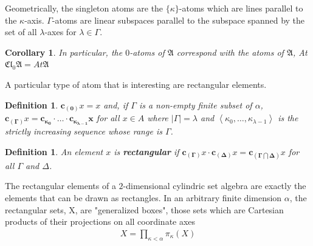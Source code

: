 \documentclass[12pt,a4paper]{article}
\newtheorem{corollary}[theorem]{Corollary}
\newtheorem{definition}[theorem]{Definition}
\begin{document}
Geometrically, the singleton atoms are the $\{\kappa\}$-atoms which are lines parallel to the $\kappa$-axis.
$\Gamma$-atoms are linear subspaces parallel to the subspace spanned by the set of all $\lambda$-axes for $\lambda\in\Gamma$.

\begin{corollary}
In particular, the $0$-atoms of $\mathfrak{A}$ correspond with the atoms of $\mathfrak{A}$, At$\mathfrak{Cl}_0\mathfrak{A}=\mathit{At}\mathfrak{A}$
\end{corollary}

A particular type of atom that is interesting are rectangular elements.

\begin{definition}
$\mathbf{c_{(0)}}x=x$ and, if $\Gamma$ is a non-empty finite subset of $\alpha$, $\mathbf{c_{(\Gamma)}}x=\mathbf{c_{\kappa_0}\cdot\ldots\cdot c_{\kappa_{\lambda-1}}x}$ for all $x\in A$ where $|\Gamma|=\lambda$ and $\left<\kappa_0,\ldots,\kappa_{\lambda-1}\right>$ is the strictly increasing sequence whose range is $\Gamma$.
\end{definition}

\begin{definition}
An element $x$ is \textbf{rectangular} if $\mathbf{c_{(\Gamma)}}x\cdot\mathbf{c_{(\Delta)}}x=\mathbf{c_{(\Gamma\bigcap\Delta)}}x$ for all $\Gamma$ and $\Delta$. 
\end{definition}

The rectangular elements of a $2$-dimensional cylindric set algebra are exactly the elements that can be drawn as rectangles.
In an arbitrary finite dimension $\alpha$, the rectangular sets, X, are "generalized boxes", those sets which are Cartesian products of their projections on all coordinate axes
\begin{align*}
    X=\prod\limits_{\kappa<\alpha} \pi_\kappa\left( X\right)
\end{align*}
\end{document}
